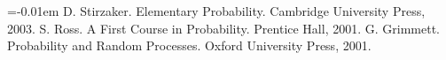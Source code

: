 
\renewcommand{\section}[2]{\vskip 0.05em}
\begin{thebibliography}{1}\itemsep=-0.01em
\setlength{\baselineskip}{0.4em}
D. Stirzaker.
\newblock Elementary Probability. 
\newblock Cambridge University Press, 2003.
S. Ross.
\newblock A First Course in Probability.
\newblock Prentice Hall, 2001.
G. Grimmett. 
\newblock Probability and Random Processes.
\newblock Oxford University Press, 2001.
\end{thebibliography}
